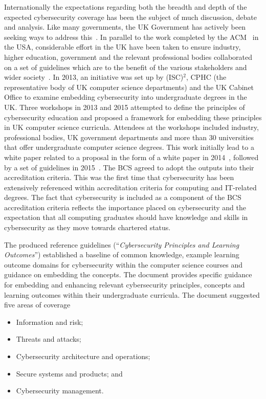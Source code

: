 \documentclass[conference]{IEEEtran}
\begin{document}
{Internationally the expectations regarding both the breadth and depth of the expected cybersecurity coverage has been the subject of much discussion, debate and analysis. Like many governments, the UK Government has actively been seeking ways to address this~\cite{UKCabinetOffice2014,ukcyberstrategy:2016}. In parallel to the work completed by the ACM~\cite{ACM2013a} in the USA, considerable effort in the UK have been taken to ensure industry, higher education, government and the relevant professional bodies collaborated on a set of guidelines which are to the benefit of the various stakeholders and wider society~\cite{Irons2016}. In 2013, an initiative was set up by (ISC)$^2$, CPHC (the representative body of UK computer science departments) and the UK Cabinet Office to examine embedding cybersecurity into undergraduate degrees in the UK. Three workshops in 2013 and 2015 attempted to define the principles of cybersecurity education and proposed a framework for embedding these principles in UK computer science curricula. Attendees at the workshops included industry, professional bodies, UK government departments and more than 30 universities that offer undergraduate computer science degrees. This work initially lead to a white paper related to a proposal in the form of a white paper in 2014~\cite{CPHCISC2014}, followed by a set of guidelines in 2015~\cite{CPHCISC2}. The BCS agreed to adopt the outputs into their accreditation criteria. This was the first time that cybersecurity has been extensively referenced within accreditation criteria for computing and IT-related degrees. The fact that cybersecurity is included as a component of the BCS accreditation criteria reflects the importance placed on cybersecurity and the expectation that all computing graduates should have knowledge and skills in cybersecurity as they move towards chartered status.

The produced reference guidelines (``{\emph{Cybersecurity Principles and Learning Outcomes}}'') \cite{CPHCISC2} established a baseline of common knowledge, example learning outcome domains for cybersecurity within the computer science courses and guidance on embedding the concepts. The document provides specific guidance for embedding and enhancing relevant cybersecurity principles, concepts and learning outcomes within their undergraduate curricula. The document suggested five areas of coverage 

\begin{itemize}
    \item Information and risk;
    \item Threats and attacks;
    \item Cybersecurity architecture and operations;
    \item Secure systems and products; and 
    \item Cybersecurity management.
\end{itemize}

}
\end{document}
